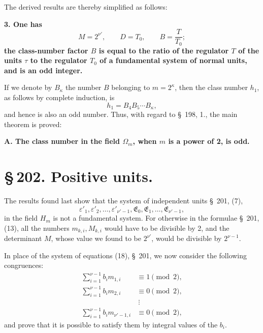 \documentclass[11pt]{article}
\begin{document}
The derived results are thereby simplified as follows:

\begin{center}\textbf{3. One has}
\[
M=2^{\nu'},\qquad D=T_0,
\qquad B=\frac{T}{T_0};
\tag{26}
\]
\textbf{the class-number factor $B$ is equal to the ratio of the regulator $T$ of the units $\tau$ to the regulator $T_0$ of a fundamental system of normal units, and is an odd integer.}\end{center}

If we denote by $B_\kappa$ the number $B$ belonging to $m=2^\kappa$, then the class number $h_1$, as follows by complete induction, is
\begin{equation}
h_1=B_4B_5\cdots B_\kappa,
\tag{27}
\end{equation}
and hence is also an odd number. Thus, with regard to \S~198, 1., the main theorem is proved:

\begin{center}\textbf{A. The class number in the field $\Omega_m$, when $m$ is a power of 2, is odd.}\end{center}

\section*{\S\,202. Positive units.}

The results found last show that the system of independent units \S~201, (7),
\[
\varepsilon'_1,\varepsilon'_2,\ldots,\varepsilon'_{\nu'-1},\mathfrak E_0,\mathfrak E_1,\ldots,\mathfrak E_{\nu'-1},
\]
in the field $H_m$ is not a fundamental system. For otherwise in the formulae \S~201, (13), all the numbers $m_{k,i},M_{k,i}$ would have to be divisible by 2, and the determinant $M$, whose value we found to be $2^{\nu'}$, would be divisible by $2^{\nu-1}$.

In place of the system of equations (18), \S~201, we now consider the following congruences:
\begin{equation}
\begin{aligned}
\sum_{i=1}^{\nu-1}b_i m_{1,i}&\equiv1\pmod2,\\
\sum_{i=1}^{\nu-1}b_i m_{2,i}&\equiv0\pmod2,\\
&\ \vdots\\
\sum_{i=1}^{\nu-1}b_i m_{\nu'-1,i}&\equiv0\pmod2,
\end{aligned}
\tag{1}
\end{equation}
and prove that it is possible to satisfy them by integral values of the $b_i$.
\end{document}

